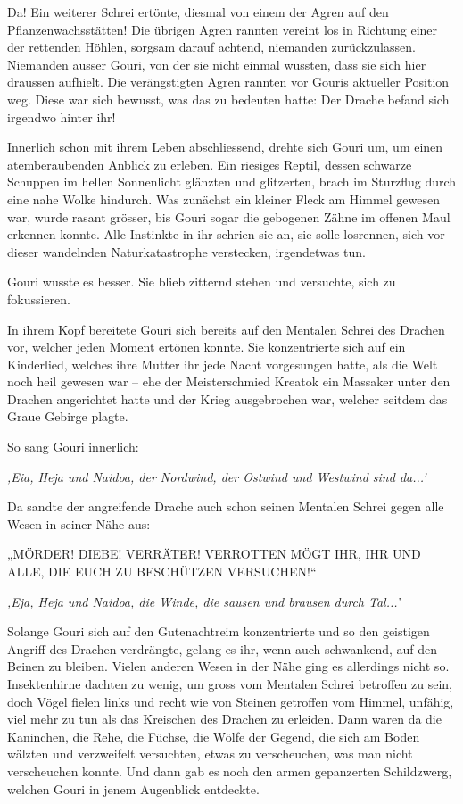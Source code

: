 \documentclass[10pt, a4paper, oneside]{book}
\begin{document}
Da! Ein weiterer Schrei ertönte, diesmal von einem der Agren auf den Pflanzenwachsstätten! Die übrigen Agren rannten vereint los in Richtung einer der rettenden Höhlen, sorgsam darauf achtend, niemanden zurückzulassen. Niemanden ausser Gouri, von der sie nicht einmal wussten, dass sie sich hier draussen aufhielt. Die verängstigten Agren rannten vor Gouris aktueller Position weg. Diese war sich bewusst, was das zu bedeuten hatte: Der Drache befand sich irgendwo hinter ihr!

Innerlich schon mit ihrem Leben abschliessend, drehte sich Gouri um, um einen atemberaubenden Anblick zu erleben. Ein riesiges Reptil, dessen schwarze Schuppen im hellen Sonnenlicht glänzten und glitzerten, brach im Sturzflug durch eine nahe Wolke hindurch. Was zunächst ein kleiner Fleck am Himmel gewesen war, wurde rasant grösser, bis Gouri sogar die gebogenen Zähne im offenen Maul erkennen konnte. Alle Instinkte in ihr schrien sie an, sie solle losrennen, sich vor dieser wandelnden Naturkatastrophe verstecken, irgendetwas tun.

Gouri wusste es besser. Sie blieb zitternd stehen und versuchte, sich zu fokussieren.

In ihrem Kopf bereitete Gouri sich bereits auf den Mentalen Schrei des Drachen vor, welcher jeden Moment ertönen konnte. Sie konzentrierte sich auf ein Kinderlied, welches ihre Mutter ihr jede Nacht vorgesungen hatte, als die Welt noch heil gewesen war – ehe der Meisterschmied Kreatok ein Massaker unter den Drachen angerichtet hatte und der Krieg ausgebrochen war, welcher seitdem das Graue Gebirge plagte.

So sang Gouri innerlich:

\textit{‚Eia, Heja und Naidoa, der Nordwind, der Ostwind und Westwind sind da...’}

Da sandte der angreifende Drache auch schon seinen Mentalen Schrei gegen alle Wesen in seiner Nähe aus:

„MÖRDER! DIEBE! VERRÄTER! VERROTTEN MÖGT IHR, IHR UND ALLE, DIE EUCH ZU BESCHÜTZEN VERSUCHEN!“

\textit{‚Eja, Heja und Naidoa, die Winde, die sausen und brausen durch Tal...’}

Solange Gouri sich auf den Gutenachtreim konzentrierte und so den geistigen Angriff des Drachen verdrängte, gelang es ihr, wenn auch schwankend, auf den Beinen zu bleiben. Vielen anderen Wesen in der Nähe ging es allerdings nicht so. Insektenhirne dachten zu wenig, um gross vom Mentalen Schrei betroffen zu sein, doch Vögel fielen links und recht wie von Steinen getroffen vom Himmel, unfähig, viel mehr zu tun als das Kreischen des Drachen zu erleiden. Dann waren da die Kaninchen, die Rehe, die Füchse, die Wölfe der Gegend, die sich am Boden wälzten und verzweifelt versuchten, etwas zu verscheuchen, was man nicht verscheuchen konnte. Und dann gab es noch den armen gepanzerten Schildzwerg, welchen Gouri in jenem Augenblick entdeckte.
\end{document}
